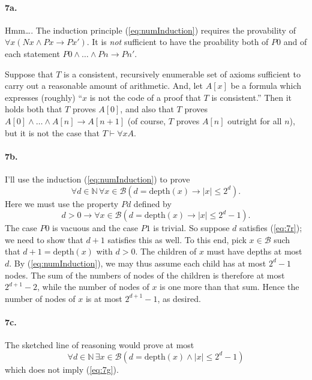 \documentclass[
]{article}
\begin{document}
\paragraph{7a.} Hmm\ldots.  The induction principle (\ref{eq:numInduction}) requires the provability of $\forall x(Nx\land Px\to Px')$.  It is \emph{not} sufficient to have the proability both of $P0$ and of each statement $P0\land\ldots\land Pn\to Pn'$.

Suppose that $T$ is a consistent, recursively enumerable set of axioms sufficient to carry out a reasonable amount of arithmetic.  And, let $A[x]$ be a formula which expresses (roughly) ``$x$ is not the code of a proof that $T$ is consistent.''  Then it holds both that $T$ proves $A[0]$, and also that $T$ proves $A[0]\land\ldots\land A[n]\to A[n+1]$ (of course, $T$ proves $A[n]$ outright for all $n$), but it is not the case that $T\vdash \forall xA$.  


\paragraph{7b.} I'll use the induction (\ref{eq:numInduction}) to prove
\begin{equation}
  \label{eq:7g}
  \forall d\in \mathbb N\, \forall x\in \mathcal B(d=\text{depth}(x)\to |x|\leq 2^d).
\end{equation}
Here we must use the property $Pd$ defined by
\begin{equation}
  \label{eq:7r}
  d>0 \to \forall x\in \mathcal B(d=\text{depth}(x) \to |x|\leq 2^{d}-1).
\end{equation}
The case $P0$ is vacuous and the case $P1$ is trivial.  So suppose $d$ satisfies (\ref{eq:7r}); we need to show that $d+1$ satisfies this as well.  To this end, pick $x\in \mathcal B$ such that $d+1=\text{depth}(x)$ with $d>0$.  The children of $x$ must have depths at most $d$.  By (\ref{eq:numInduction}), we may thus assume each child has at most $2^d-1$ nodes. The sum of the numbers of nodes of the children is therefore at most $2^{d+1} - 2$, while the number of nodes of $x$ is one more than that sum. Hence the number of nodes of $x$ is at most $2^{d+1} - 1$, as desired.

\paragraph{7c.} The sketched line of reasoning would prove at most 
\begin{equation*}
  \forall d\in \mathbb N\, \exists x\in \mathcal B(d=\text{depth}(x)\land |x|\leq 2^d - 1)
\end{equation*}
which does not imply (\ref{eq:7g}).
\end{document}
